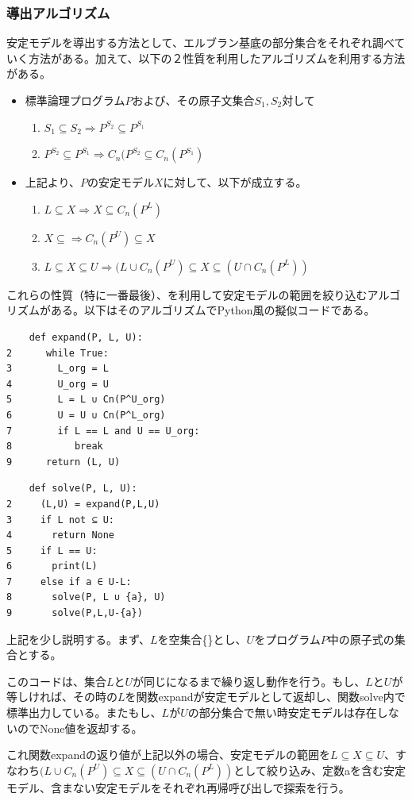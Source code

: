 \documentclass[dvipdfmx]{jsarticle}
\begin{document}
  \subsubsection{導出アルゴリズム}
  安定モデルを導出する方法として、エルブラン基底の部分集合をそれぞれ調べていく方法がある。加えて、以下の２性質を利用したアルゴリズムを利用する方法がある。
  \begin{itemize}
    \item 標準論理プログラム$P$および、その原子文集合$S_{1}, S_{2}$対して
    \begin{enumerate}
      \item $S_{1} \subseteq S_{2} \Rightarrow P^{S_{2}} \subseteq P^{S_{1}}$
      \item $P^{S_{2}} \subseteq P^{S_{1}} \Rightarrow C_{n}(P^{S_{2}} \subseteq C_{n}(P^{S_{1}})$
    \end{enumerate}
    \item 上記より、$P$の安定モデル$X$に対して、以下が成立する。
    \begin{enumerate}
      \item $L \subseteq X \Rightarrow X \subseteq C_{n}(P^{L})$
      \item $X \subseteq \Rightarrow C_{n}(P^{U}) \subseteq X$
      \item $L \subseteq X \subseteq U \Rightarrow (L \cup C_{n}(P^{U}) \subseteq X \subseteq (U \cap C_{n}(P^{L}))$
    \end{enumerate}
  \end{itemize}
これらの性質（特に一番最後）、を利用して安定モデルの範囲を絞り込むアルゴリズムがある。以下はそのアルゴリズムでPython風の擬似コードである。
\begin{verbatim}
    def expand(P, L, U):
2      while True:
3        L_org = L
4        U_org = U
5        L = L ∪ Cn(P^U_org)
6        U = U ∪ Cn(P^L_org)
7        if L == L and U == U_org:
8           break
9      return (L, U)
\end{verbatim}
\begin{verbatim}
    def solve(P, L, U):
2     (L,U) = expand(P,L,U)
3     if L not ⊆ U:
4       return None
5     if L == U:
6       print(L)
7     else if a ∈ U-L:
8       solve(P, L ∪ {a}, U)
9       solve(P,L,U-{a})

\end{verbatim}
上記を少し説明する。まず、$L$を空集合\{\}とし、$U$をプログラム$P$中の原子式の集合とする。\par
このコードは、集合$L$と$U$が同じになるまで繰り返し動作を行う。もし、$L$と$U$が等しければ、その時の$L$を関数expandが安定モデルとして返却し、関数solve内で標準出力している。またもし、$L$が$U$の部分集合で無い時安定モデルは存在しないのでNone値を返却する。\par
これ関数expandの返り値が上記以外の場合、安定モデルの範囲を$L \subseteq X \subseteq U$、すなわち$(L \cup C_{n}(P^{U}) \subseteq X \subseteq (U \cap C_{n}(P^{L}))$として絞り込み、定数aを含む安定モデル、含まない安定モデルをそれぞれ再帰呼び出しで探索を行う。
\end{document}
